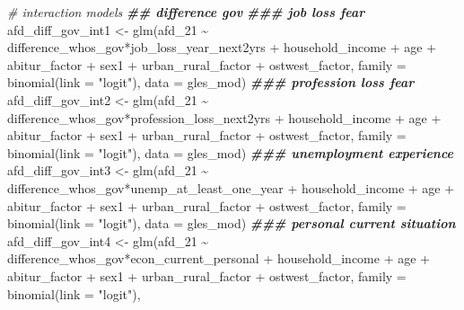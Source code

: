 \documentclass[
]{article}
\newenvironment{Shaded}{\begin{snugshade}}{\end{snugshade}}
\newcommand{\AttributeTok}[1]{\textcolor[rgb]{0.77,0.63,0.00}{#1}}
\newcommand{\CommentTok}[1]{\textcolor[rgb]{0.56,0.35,0.01}{\textit{#1}}}
\newcommand{\DocumentationTok}[1]{\textcolor[rgb]{0.56,0.35,0.01}{\textbf{\textit{#1}}}}
\newcommand{\FunctionTok}[1]{\textcolor[rgb]{0.00,0.00,0.00}{#1}}
\newcommand{\NormalTok}[1]{#1}
\newcommand{\OtherTok}[1]{\textcolor[rgb]{0.56,0.35,0.01}{#1}}
\newcommand{\SpecialCharTok}[1]{\textcolor[rgb]{0.00,0.00,0.00}{#1}}
\newcommand{\StringTok}[1]{\textcolor[rgb]{0.31,0.60,0.02}{#1}}
\begin{document}
\begin{Shaded}
\begin{Highlighting}[]
\CommentTok{\# interaction models }
\DocumentationTok{\#\# difference gov}
\DocumentationTok{\#\#\# job loss fear }
\NormalTok{afd\_diff\_gov\_int1 }\OtherTok{\textless{}{-}} \FunctionTok{glm}\NormalTok{(afd\_21 }\SpecialCharTok{\textasciitilde{}}\NormalTok{ difference\_whos\_gov}\SpecialCharTok{*}\NormalTok{job\_loss\_year\_next2yrs }\SpecialCharTok{+}\NormalTok{ household\_income }\SpecialCharTok{+}\NormalTok{ age }\SpecialCharTok{+}\NormalTok{ abitur\_factor }\SpecialCharTok{+}\NormalTok{ sex1 }\SpecialCharTok{+}\NormalTok{ urban\_rural\_factor }\SpecialCharTok{+}\NormalTok{ ostwest\_factor, }\AttributeTok{family =} \FunctionTok{binomial}\NormalTok{(}\AttributeTok{link =} \StringTok{"logit"}\NormalTok{), }
                         \AttributeTok{data =}\NormalTok{ gles\_mod)}
\DocumentationTok{\#\#\# profession loss fear}
\NormalTok{afd\_diff\_gov\_int2 }\OtherTok{\textless{}{-}} \FunctionTok{glm}\NormalTok{(afd\_21 }\SpecialCharTok{\textasciitilde{}}\NormalTok{ difference\_whos\_gov}\SpecialCharTok{*}\NormalTok{profession\_loss\_next2yrs }\SpecialCharTok{+}\NormalTok{ household\_income }\SpecialCharTok{+}\NormalTok{ age }\SpecialCharTok{+}\NormalTok{ abitur\_factor }\SpecialCharTok{+}\NormalTok{ sex1 }\SpecialCharTok{+}\NormalTok{ urban\_rural\_factor }\SpecialCharTok{+}\NormalTok{ ostwest\_factor, }\AttributeTok{family =} \FunctionTok{binomial}\NormalTok{(}\AttributeTok{link =} \StringTok{"logit"}\NormalTok{), }
                         \AttributeTok{data =}\NormalTok{ gles\_mod)}
\DocumentationTok{\#\#\# unemployment experience}
\NormalTok{afd\_diff\_gov\_int3 }\OtherTok{\textless{}{-}} \FunctionTok{glm}\NormalTok{(afd\_21 }\SpecialCharTok{\textasciitilde{}}\NormalTok{ difference\_whos\_gov}\SpecialCharTok{*}\NormalTok{unemp\_at\_least\_one\_year }\SpecialCharTok{+}\NormalTok{ household\_income }\SpecialCharTok{+}\NormalTok{ age }\SpecialCharTok{+}\NormalTok{ abitur\_factor }\SpecialCharTok{+}\NormalTok{ sex1 }\SpecialCharTok{+}\NormalTok{ urban\_rural\_factor }\SpecialCharTok{+}\NormalTok{ ostwest\_factor, }\AttributeTok{family =} \FunctionTok{binomial}\NormalTok{(}\AttributeTok{link =} \StringTok{"logit"}\NormalTok{), }
                         \AttributeTok{data =}\NormalTok{ gles\_mod)}
\DocumentationTok{\#\#\# personal current situation}
\NormalTok{afd\_diff\_gov\_int4 }\OtherTok{\textless{}{-}} \FunctionTok{glm}\NormalTok{(afd\_21 }\SpecialCharTok{\textasciitilde{}}\NormalTok{ difference\_whos\_gov}\SpecialCharTok{*}\NormalTok{econ\_current\_personal }\SpecialCharTok{+}\NormalTok{ household\_income }\SpecialCharTok{+}\NormalTok{ age }\SpecialCharTok{+}\NormalTok{ abitur\_factor }\SpecialCharTok{+}\NormalTok{ sex1 }\SpecialCharTok{+}\NormalTok{ urban\_rural\_factor }\SpecialCharTok{+}\NormalTok{ ostwest\_factor, }\AttributeTok{family =} \FunctionTok{binomial}\NormalTok{(}\AttributeTok{link =} \StringTok{"logit"}\NormalTok{), }

\end{Highlighting}
\end{Shaded}
\end{document}
